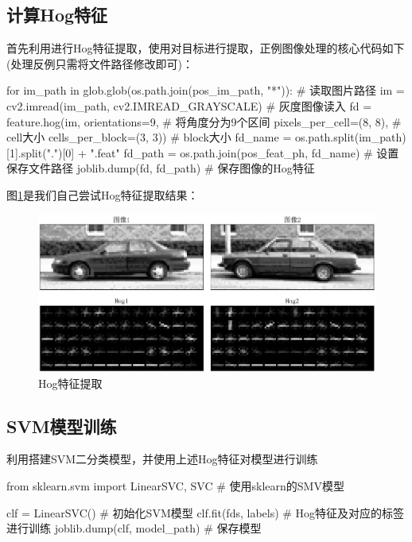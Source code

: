 \documentclass[12pt, a4paper, oneside]{ctexart}
\numberwithin{equation}{section}  %
\begin{document}
\subsection{计算Hog特征}
首先利用进行Hog特征提取，使用对目标进行提取，正例图像处理的核心代码如下(处理反例只需将文件路径修改即可)：
\begin{pythoncode}
for im_path in glob.glob(os.path.join(pos_im_path, "*")):  # 读取图片路径
    im = cv2.imread(im_path, cv2.IMREAD_GRAYSCALE)  # 灰度图像读入
    fd = feature.hog(im, orientations=9,  # 将角度分为9个区间
                      pixels_per_cell=(8, 8),  # cell大小
                      cells_per_block=(3, 3))  # block大小
    fd_name = os.path.split(im_path)[1].split(".")[0] + ".feat"
    fd_path = os.path.join(pos_feat_ph, fd_name)  # 设置保存文件路径
    joblib.dump(fd, fd_path)  # 保存图像的Hog特征
\end{pythoncode}

图\ref{fig-hog}是我们自己尝试Hog特征提取结果：
\begin{figure}[htbp]
  \hspace*{-1.1cm}
  \centering
  \includegraphics[scale=0.6]{hog特征提取.png}
  \caption{Hog特征提取}
  \label{fig-hog}
\end{figure}
\subsection{SVM模型训练}
利用搭建SVM二分类模型，并使用上述Hog特征对模型进行训练
\begin{pythoncode}
from sklearn.svm import LinearSVC, SVC  # 使用sklearn的SMV模型

clf = LinearSVC()  # 初始化SVM模型
clf.fit(fds, labels)  # Hog特征及对应的标签进行训练
joblib.dump(clf, model_path)  # 保存模型
\end{pythoncode}
\end{document}
